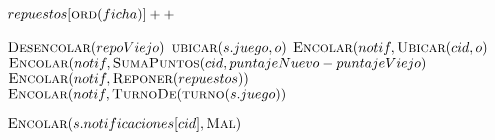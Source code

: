 \begin{algorithm}[H]
    \begin{algorithmic}[1]
                    \State{}
            \State{}
            \State{}
                \State{}
            \EndFor
                \State{}
                \State$repuestos[\textsc{ord}(ficha)]++$
                \iffalse
                \If{$\textsc{Definido?}(repuestos,ficha)$}
                    \State$\textsc{Definir}(repuestos,ficha,\textsc{Significado}(repuestos,ficha)+1)$
                \Else
                    \State$\textsc{Definir}(repuestos,ficha,1)$
                \EndIf
                \fi
                \State$\textsc{Desencolar}(repoViejo)$
            \EndFor
            \State{}
            \State$\textsc{ubicar}(s.juego,o)$
            \State{}
                \State{}
                \State$\textsc{Encolar}(notif,\textsc{Ubicar}(cid,o)$
                \State$\textsc{Encolar}(notif,\textsc{SumaPuntos}(cid,puntajeNuevo-puntajeViejo)$
                    \State$\textsc{Encolar}(notif,\textsc{Reponer}(repuestos))$
                \EndIf
                \State$\textsc{Encolar}(notif,\textsc{TurnoDe}(\textsc{turno}(s.juego))$
            \EndFor
            \iffalse
            \If{\textsc{Cardinal}(o)$>0$}
                \State\asignar{nuevasLetras}{\textsc{CrearArreglo}(\textsc{Cardinal}(o))}
                \For{$1\leq i < $\textsc{ Cardinal}(o)}
                    \State\asignar{letra}{\textsc{Desapilar}(s.juego.repositorio)}
                    \State\textsc{AgregarAtras}($nuevasLetras$, $letra$)
                \EndFor
                \For{$letra\in nuevasLetras$}
                    \State{\textsc{Apilar}(letra, s.juego.repositorio)}
                \EndFor
                \State\textsc{Encolar}(\textsc{Reponer}($nuevasLetras$), $s.notificaciones[cid]$)
            \EndIf
            \State\textsc{ubicar}(s.juego, o)
            \For{$1\leq i < s.jugadoresConectados$}
               \State\textsc{Encolar}(\textsc{Ubicar}($juego.variante.n$), $s.notificaciones[i]$)
               \State\textsc{Encolar}(\textsc{TurnoDe}(\textsc{Turno}($s.juego$)), $s.notificaciones[i]$)
            \EndFor
            \fi
        \Else
            \State$\textsc{Encolar}(s.notificaciones[cid], \textsc{Mal})$
        \EndIf
    \end{algorithmic}
\end{algorithm}

